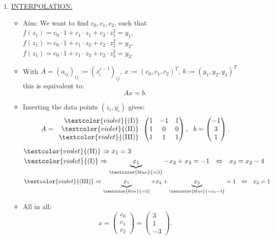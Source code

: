 {
	\color{solution}
	\begin{enumerate}
		\item \underline{INTERPOLATION:}
		\begin{itemize}
			\item 
			Aim: We want to find $c_0,c_1,c_2$, such that\\
			$f(z_1)=c_0\cdot 1+c_1\cdot z_1+c_2\cdot z_1^2 = y_1$,\\
			$f(z_1)=c_0\cdot 1+c_1\cdot z_2+c_2\cdot z_2^2 = y_2$,\\
			$f(z_1)=c_0\cdot 1+c_1\cdot z_3+c_2\cdot z_3^2 = y_3$.
			\item 
			With $A = (a_{ij})_{ij} := (z_i^{j-1})_{ij},~ x:= (c_0,c_1,c_2)^T,~b:= (y_1,y_2,y_3)^T$ this is equivalent to:
			$$
			Ax = b.
			$$
			\item 
			Inserting the data points $(z_i,y_i)$ gives: 
			\begin{align*} 
			A = \begin{array}{r}
			\textcolor{violet}{\text{(I)}}\\
			\textcolor{violet}{\text{(II)}}\\
			\textcolor{violet}{\text{(III)}}
			\end{array}
			\begin{pmatrix} 
			1&-1&1\\
			1&0&0\\
			1&1&1\end{pmatrix}, ~~
			b =\begin{pmatrix} -1\\3\\1\end{pmatrix}.
			\end{align*}
			$\textcolor{violet}{\text{(II)}}\Rightarrow x_1 = 3$\\
			$\textcolor{violet}{\text{(I)}}\Rightarrow \underbrace{x_1}_{\textcolor{blue}{=3}}-x_2+x_3=-1 \ \ \Leftrightarrow\ \ x_3=x_2-4$\\
			$\textcolor{violet}{\text{(III)}}\Rightarrow \underbrace{x_1}_{\textcolor{blue}{=3}}+x_2+\underbrace{x_3}_{\textcolor{blue}{=x_2-4}} = 1\ \ \Leftrightarrow\ \ x_2 = 1$
			\item 
			All in all: $$x=\begin{pmatrix} c_0\\c_1\\c_2\end{pmatrix}
			=\begin{pmatrix}3\\1\\-3\end{pmatrix}.$$

\end{itemize}
\end{enumerate}}
